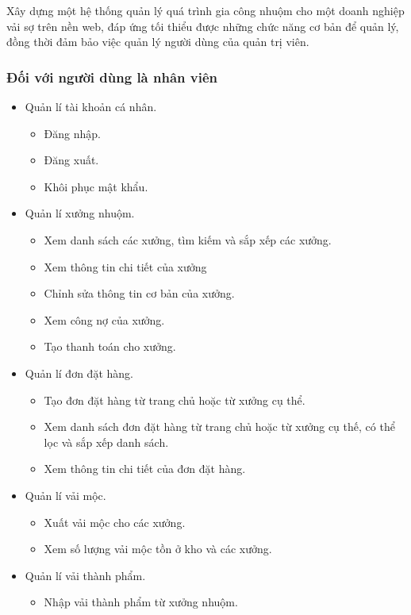 Xây dựng một hệ thống quản lý quá trình gia công nhuộm cho một doanh nghiệp vải sợ trên nền web, đáp ứng tối thiểu được những chức năng cơ bản để quản lý, đồng thời đảm bảo việc quản lý người dùng của quản trị viên.
\subsubsection{Đối với người dùng là nhân viên}
\begin{itemize}
    \item Quản lí tài khoản cá nhân.
    \begin{itemize}
        \item Đăng nhập.
        \item Đăng xuất.
        \item Khôi phục mật khẩu.
    \end{itemize}
    \item Quản lí xưởng nhuộm.
    \begin{itemize}
        \item Xem danh sách các xưởng, tìm kiếm và sắp xếp các xưởng.
        \item Xem thông tin chi tiết của xưởng
        \item Chỉnh sửa thông tin cơ bản của xưởng.
        \item Xem công nợ của xưởng.
        \item Tạo thanh toán cho xưởng.
    \end{itemize}
    \item Quản lí đơn đặt hàng.
    \begin{itemize}
        \item Tạo đơn đặt hàng từ trang chủ hoặc từ xưởng cụ thể.
        \item Xem danh sách đơn đặt hàng từ trang chủ hoặc từ xưởng cụ thế, có thể lọc và sắp xếp danh sách.
        \item Xem thông tin chi tiết của đơn đặt hàng.
    \end{itemize}
    \item Quản lí vải mộc.
    \begin{itemize}
        \item Xuất vải mộc cho các xưởng.
        \item Xem số lượng vải mộc tồn ở kho và các xưởng.
    \end{itemize}
    \item Quản lí vải thành phẩm.
    \begin{itemize}
        \item Nhập vải thành phẩm từ xưởng nhuộm.

\end{itemize}
\end{itemize}
